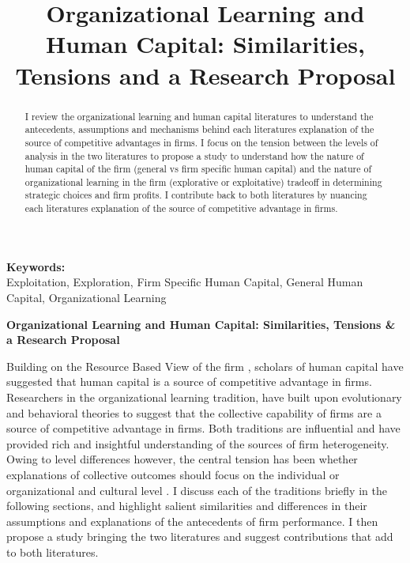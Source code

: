 \documentclass[12pt,letterpaper]{article}
\begin{document}
\title{Organizational Learning and Human Capital: Similarities, Tensions and a Research Proposal}
\date{}
\maketitle

\begin{abstract} 
\normalsize 
I review the organizational learning and human capital literatures to understand the antecedents, assumptions and mechanisms behind each literature\textquotesingle s explanation of the source of competitive advantages in firms. I focus on the tension between the levels of analysis in the two literatures to propose a study to understand how the nature of human capital of the firm (general vs firm specific human capital) and the nature of organizational learning  in the firm (explorative or exploitative) tradeoff in determining strategic choices and firm profits. I contribute back to both literatures by nuancing each literature\textquotesingle s explanation of the source of competitive advantage in firms.
\end{abstract}


{\textbf{Keywords:} \\\indent Exploitation, Exploration, Firm Specific Human Capital, General Human Capital,  Organizational Learning}

\newpage
\pagestyle{fancy}
\fancyhf{}
\rhead{\thepage}

\begin{center}
\textbf{Organizational Learning and Human Capital: Similarities, Tensions \& a Research Proposal}
\end{center}

Building on the Resource Based View of the firm \citep{Barney1991}, scholars of human capital have suggested that human capital is a source of competitive advantage in firms. Researchers in the organizational learning tradition, have built upon evolutionary \citep{Nelson1982} and behavioral theories \citep{Cyert1963, March1958} to suggest that the collective capability of firms are a source of competitive advantage in firms. Both traditions are influential and have provided rich and insightful understanding of the sources of firm heterogeneity. Owing to level differences however, the central tension has been whether explanations of collective outcomes should focus on the individual or organizational and cultural level \citep{Udehn2001}. I discuss each of the traditions briefly in the following sections, and highlight salient similarities and differences in their assumptions and explanations of the antecedents of firm performance. I then propose a study bringing the two literatures and suggest contributions that add to both literatures.
\end{document}
